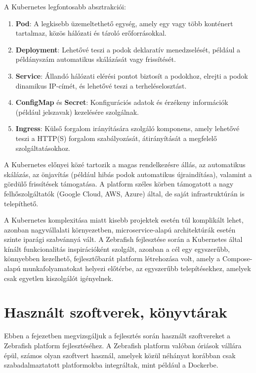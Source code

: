 A Kubernetes legfontosabb absztrakciói:
\begin{enumerate}
        \item \textbf{Pod}: A legkisebb üzemeltethető egység, amely egy vagy több konténert tartalmaz, közös hálózati és tároló erőforrásokkal.
        \item \textbf{Deployment}: Lehetővé teszi a podok deklaratív menedzselését, például a példányszám automatikus skálázását vagy frissítését.
        \item \textbf{Service}: Állandó hálózati elérési pontot biztosít a podokhoz, elrejti a podok dinamikus IP-címét, és lehetővé teszi a terheléselosztást.
        \item \textbf{ConfigMap} és \textbf{Secret}: Konfigurációs adatok és érzékeny információk (például jelszavak) kezelésére szolgálnak.
        \item \textbf{Ingress}: Külső forgalom irányítására szolgáló komponens, amely lehetővé teszi a HTTP(S) forgalom szabályozását, átirányítását a megfelelő szolgáltatásokhoz.
\end{enumerate}

A Kubernetes előnyei közé tartozik a magas rendelkezésre állás, az automatikus
skálázás, az önjavítás (például hibás podok automatikus újraindítása), valamint
a gördülő frissítések támogatása. A platform széles körben támogatott a nagy
felhőszolgáltatók (Google Cloud, AWS, Azure) által, de saját infrastruktúrán is
telepíthető.

A Kubernetes komplexitása miatt kisebb projektek esetén túl komplikált lehet,
azonban nagyvállalati környezetben, microservice-alapú architektúrák esetén
szinte iparági szabvánnyá vált. A Zebrafish fejlesztése során a Kubernetes
által kínált funkcionalitás inspirációként szolgált, azonban a cél egy
egyszerűbb, könnyebben kezelhető, fejlesztőbarát platform létrehozása volt,
amely a Compose-alapú munkafolyamatokat helyezi előtérbe, az egyszerűbb
telepítésekhez, amelyek csak egyetlen kiszolgálót igényelnek.

\section{Használt szoftverek, könyvtárak}

Ebben a fejezetben megvizsgáljuk a fejlesztés során használt szoftvereket a Zebrafish platform fejlesztéséhez.
A Zebrafish platform valóban óriások vállára épül, számos olyan szoftvert használ, amelyek közül néhányat korábban csak szabadalmaztatott platformokba integráltak, mint például a Dockerbe.

